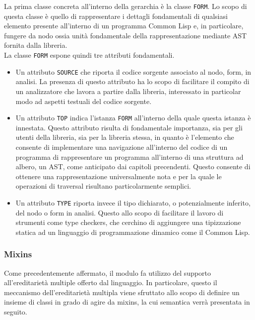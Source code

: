 La prima classe concreta all’interno della gerarchia è la classe
\texttt{FORM}. Lo scopo di questa classe è quello di rappresentare i dettagli
fondamentali di qualsiasi elemento presente all’interno di un programma Common
Lisp e, in particolare, fungere da nodo ossia unità fondamentale della
rappresentazione mediante AST fornita dalla libreria.\\

La classe \texttt{FORM} espone quindi tre attributi fondamentali.

\begin{itemize}

\item Un attributo \texttt{SOURCE} che riporta il codice sorgente associato al
nodo, form, in analisi. La presenza di questo attributo ha lo scopo di
facilitare il compito di un analizzatore che lavora a partire dalla libreria,
interessato in particolar modo ad aspetti testuali del codice sorgente.

\item Un attributo \texttt{TOP} indica l'istanza \texttt{FORM} all’interno
della quale questa istanza è innestata. Questo attributo risulta di
fondamentale importanza, sia per gli utenti della libreria, sia per la
libreria stessa, in quanto è l'elemento che consente di implementare una
navigazione all'interno del codice di un programma di rappresentare un
programma all’interno di una struttura ad albero, un AST, come anticipato dai
capitoli precendenti. Questo consente di ottenere una rappresentazione
universalmente nota e per la quale le operazioni di traversal risultano
particolarmente semplici.

\item Un attributo \texttt{TYPE} riporta invece il tipo dichiarato, o
potenzialmente inferito, del nodo o form in analisi. Questo allo scopo di
facilitare il lavoro di strumenti come type checkers, che cerchino di
aggiungere una tipizzazione statica ad un linguaggio di programmazione
dinamico come il Common Lisp.

\end{itemize}

\subsubsection{Mixins}

Come precedentemente affermato, il modulo fa utilizzo del supporto
all'ereditarietà multiple offerto dal linguaggio. In particolare, questo il
meccanismo dell'ereditarietà multipla viene sfruttato allo scopo di definire
un insieme di classi in grado di agire da mixins, la cui semantica verrà
presentata in seguito.\\

